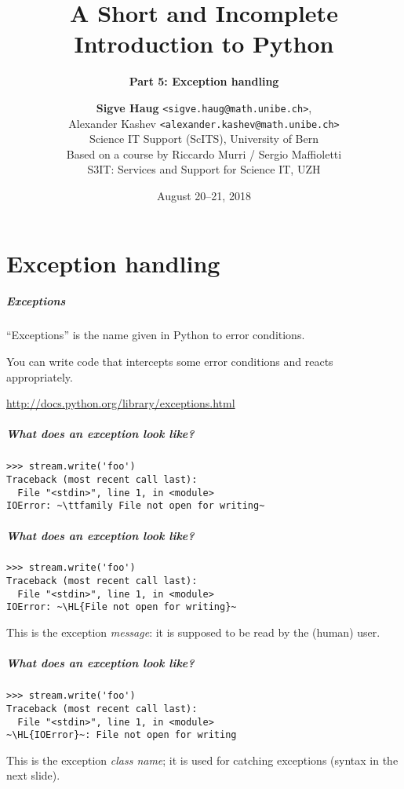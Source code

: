 \documentclass[english,serif,mathserif,xcolor=pdftex,dvipsnames,table]{beamer}
\title[5. Exception handling]{%
  A Short and Incomplete Introduction to Python
}
\subtitle{\bfseries Part 5: Exception handling}
\author[S.~Haug]{%
  \textbf{Sigve Haug} \texttt{<sigve.haug@math.unibe.ch>}, \\
  Alexander Kashev \texttt{<alexander.kashev@math.unibe.ch>} \\
  Science IT Support (ScITS), University of Bern \\
  \medskip
  Based on a course by Riccardo Murri / Sergio Maffioletti
  \\
  S3IT: Services and Support for Science IT, UZH
}
\date{August 20--21, 2018}
\begin{document}
\maketitle


\part{Exception handling}

\begin{frame}[fragile]
  \frametitle{Exceptions}

  ``Exceptions'' is the name given in Python to error conditions.

  \+
  You can write code that intercepts some error conditions and
  reacts appropriately.

  \+
  \begin{seealso}
    \url{http://docs.python.org/library/exceptions.html}
  \end{seealso}
\end{frame}


\begin{frame}[fragile]
  \frametitle{What does an exception look like?}
\begin{lstlisting}
>>> stream.write('foo')
Traceback (most recent call last):
  File "<stdin>", line 1, in <module>
IOError: ~\ttfamily File not open for writing~
\end{lstlisting}
\end{frame}


\begin{frame}[fragile]
  \frametitle{What does an exception look like?}
\begin{lstlisting}
>>> stream.write('foo')
Traceback (most recent call last):
  File "<stdin>", line 1, in <module>
IOError: ~\HL{File not open for writing}~
\end{lstlisting}

  \+
  This is the exception \emph{message}: it is supposed to be read
  by the (human) user.
\end{frame}


\begin{frame}[fragile]
  \frametitle{What does an exception look like?}
\begin{lstlisting}
>>> stream.write('foo')
Traceback (most recent call last):
  File "<stdin>", line 1, in <module>
~\HL{IOError}~: File not open for writing
\end{lstlisting}

  \+ This is the exception \emph{class name}; it is used for catching
  exceptions (syntax in the next slide).
\end{frame}
\end{document}
